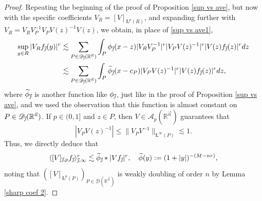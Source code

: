 \documentclass[11pt, reqno]{amsart}
\theoremstyle{definition}
\theoremstyle{remark}
\numberwithin{equation}{section}
\newcommand{\A}{\mathscr A}
\newcommand{\D}{\mathscr D}
\newcommand{\R}{\mathbb R}
\newcommand{\vj}{\vec{\textit{\j}}}
\newcommand{\vn}{\vec n}
\newcommand{\aveL}{\textit{\L}}
\newcommand{\Ave}[3]{\langle#1\rangle_{#2,#3}}
\newcommand{\Red}[3]{[#1]_{#2,#3}}
\newcommand{\abs}[1]{|#1|}
\newcommand{\Norm}[2]{\|#1\|_{#2}}
\begin{document}
\begin{proof}
Repeating the beginning of the proof of Proposition \ref{sup vs ave}, but now with the specific coefficients $V_R=[V]_{\aveL^p(R)}$, and expanding further with $V_R=V_R V_P^{-1}V_P V(z)^{-1}V(z)$, we obtain, in place of \eqref{sup vs ave1},
\begin{equation}\label{sup vs ave2}
\begin{split}
\sup_{y\in R}\abs{V_R f_{\vj}(y)}^r
&\lesssim\sum_{P\in\D_{\vj}(\R^{\vn})}\int_P\phi_{\vj}(x-z)\abs{V_R V_P^{-1}}^r\abs{V_P V(z)^{-1}}^r\abs{V(z) f_{\vj}(z)}^r dz \\
&\lesssim\sum_{P\in\D_{\vj}(\R^{\vn})}\int_P\widetilde{\phi}_{\vj}(x-c_P)
\abs{V_P V(z)^{-1}}^r\abs{V(z) f_{\vj}(z)}^r dz,
\end{split}
\end{equation}
where $\widetilde{\phi}_{\vj}$ is another function like $\phi_{\vj}$, just like in the proof of Proposition \ref{sup vs ave}, and we used the observation that this function is almost constant on $P\in\D_{\vj}(\R^{\vn})$. If $p\in(0,1]$ and $z\in P$, then $V\in\A_p(\R^{\vn})$ guarantees that
\begin{equation*}
\abs{V_P V(z)^{-1}}
\leq\Norm{V_P V^{-1}}{\aveL^\infty(P)}\lesssim 1.
\end{equation*}
Thus, we directly deduce that
\begin{equation}\label{sup vs V1}
\Ave{\Red{V}{\vj}{p}f_{\vj}}{\vj}{\infty}^r
\lesssim \widetilde{\phi}_{\vj}*\abs{Vf_{\vj}}^r,\quad
\widetilde{\phi}(y):=(1+\abs{y})^{-(M-nr)},
\end{equation}
noting that $([V]_{\aveL^p(P)})_{P\in\D(\R^{\vn})}$ is weakly doubling of order $n$ by Lemma \ref{sharp coef 2}.


\end{proof}
\end{document}
